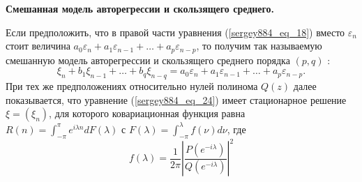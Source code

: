 \textbf{Смешанная модель авторегрессии и скользящего среднего.}

Если предположить, что в правой части уравнения (\ref{sergey884_eq_18}) вместо $\varepsilon_n$ стоит величина $a_0 \varepsilon_n+a_1 \varepsilon_{n-1}+\ldots+a_p \varepsilon_{n-p}$, то получим так называемую смешанную модель авторегрессии и скользящего среднего порядка $(p, q)$ :
\begin{equation}\label{sergey884_eq_24}
\xi_n+b_1 \xi_{n-1}+\ldots+b_q \xi_{n-q}=a_0 \varepsilon_n+a_1 \varepsilon_{n-1}+\ldots+a_p \varepsilon_{n-p} .
\end{equation}
При тех же предположениях относительно нулей полинома $Q(z)$ далее показывается, что уравнение (\ref{sergey884_eq_24}) имеет стационарное решение $\xi=\left(\xi_n\right)$, для которого ковариационная функция равна $R(n)=\int_{-\pi}^\pi e^{i \lambda n} d F(\lambda)$ с $F(\lambda)=\int_{-\pi}^\lambda f(\nu) d \nu$, где
$$
f(\lambda)=\frac{1}{2 \pi}\left|\frac{P\left(e^{-i \lambda}\right)}{Q\left(e^{-i \lambda}\right)}\right|^2
$$

